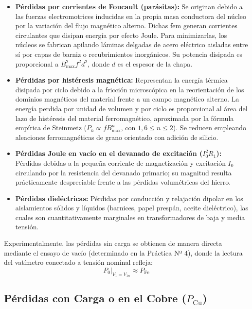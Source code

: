 \begin{itemize}
    \item \textbf{Pérdidas por corrientes de Foucault (parásitas):} Se originan debido a las fuerzas electromotrices inducidas en la propia masa conductora del núcleo por la variación del flujo magnético alterno. Dichas fem generan corrientes circulantes que disipan energía por efecto Joule. Para minimizarlas, los núcleos se fabrican apilando láminas delgadas de acero eléctrico aisladas entre sí por capas de barniz o recubrimientos inorgánicos. Su potencia disipada es proporcional a $B_{\text{max}}^2 f^2 d^2$, donde $d$ es el espesor de la chapa.
    \item \textbf{Pérdidas por histéresis magnética:} Representan la energía térmica disipada por ciclo debido a la fricción microscópica en la reorientación de los dominios magnéticos del material frente a un campo magnético alterno. La energía perdida por unidad de volumen y por ciclo es proporcional al área del lazo de histéresis del material ferromagnético, aproximada por la fórmula empírica de Steinmetz ($P_h \propto f B_{\text{max}}^n$, con $1{,}6 \le n \le 2$). Se reducen empleando aleaciones ferromagnéticas de grano orientado con adición de silicio.
    \item \textbf{Pérdidas Joule en vacío en el devanado de excitación ($I_0^2 R_1$):} Pérdidas debidas a la pequeña corriente de magnetización y excitación $I_0$ circulando por la resistencia del devanado primario; su magnitud resulta prácticamente despreciable frente a las pérdidas volumétricas del hierro.
    \item \textbf{Pérdidas dieléctricas:} Pérdidas por conducción y relajación dipolar en los aislamientos sólidos y líquidos (barnices, papel prespán, aceite dieléctrico), las cuales son cuantitativamente marginales en transformadores de baja y media tensión.
\end{itemize}

Experimentalmente, las pérdidas sin carga se obtienen de manera directa mediante el ensayo de vacío (determinado en la Práctica Nº 4), donde la lectura del vatímetro conectado a tensión nominal refleja:
\begin{equation}
    P_0 \big|_{V_1 = V_{1n}} \approx P_{\text{Fe}}
\end{equation}

\subsection{Pérdidas con Carga o en el Cobre (\texorpdfstring{$P_{\text{Cu}}$}{P\_Cu})}

